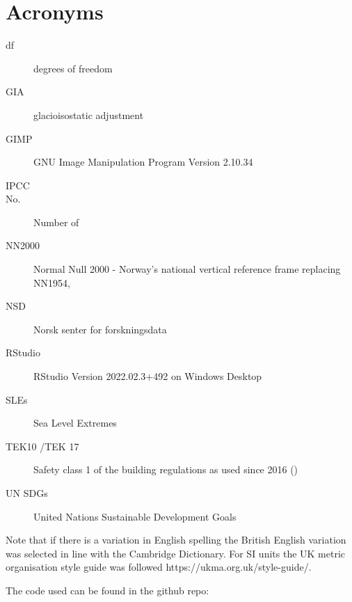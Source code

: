
\chapter{Acronyms}
\begin{description}
\item[df]degrees of freedom
\item[GIA] glacioisostatic adjustment
\item[GIMP] GNU Image Manipulation Program Version 2.10.34
\item[IPCC] 
\item[No.] Number of
\item[NN2000] Normal Null 2000 - Norway's national vertical reference frame replacing NN1954, 
\item[NSD] Norsk senter for forskningsdata
\item [RStudio] RStudio Version 2022.02.3+492 on Windows Desktop
\item[SLEs] Sea Level Extremes
\item[TEK10 /TEK 17] Safety class 1 of the building regulations as used since 2016 (\cite{tides_high_2022})
\item [UN SDGs] United Nations Sustainable Development Goals 
\end{description}

Note that if there is a variation in English spelling the British English variation was selected in line with the Cambridge Dictionary. For SI units the UK metric organisation style guide was followed https://ukma.org.uk/style-guide/.  

The code used can be found in the github repo: 